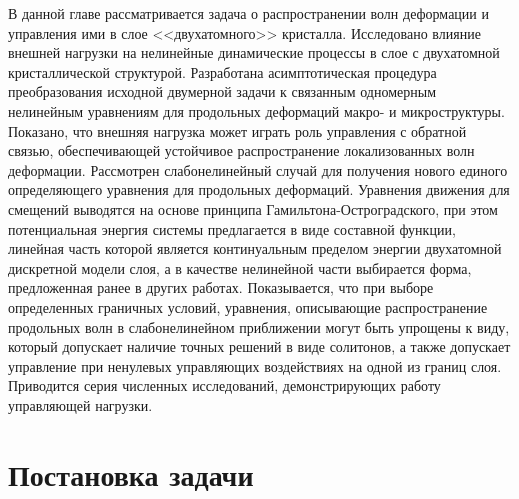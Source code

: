 В данной главе рассматривается задача о распространении волн деформации и управления ими в слое <<двухатомного>> кристалла. Исследовано влияние внешней нагрузки на нелинейные динамические процессы в слое с двухатомной кристаллической структурой. Разработана асимптотическая процедура преобразования исходной двумерной задачи к связанным одномерным нелинейным уравнениям для продольных деформаций макро- и микроструктуры. Показано, что внешняя нагрузка может играть роль управления с обратной связью, обеспечивающей устойчивое распространение локализованных волн деформации. Рассмотрен слабонелинейный случай для получения нового единого определяющего уравнения для продольных деформаций. Уравнения движения для смещений выводятся на основе принципа Гамильтона-Остроградского, при этом потенциальная энергия системы предлагается в виде составной функции, линейная часть которой является континуальным пределом энергии двухатомной дискретной модели слоя, а в качестве нелинейной части выбирается форма, предложенная ранее в других работах. Показывается, что при выборе определенных граничных условий, уравнения, описывающие распространение продольных волн в слабонелинейном приближении могут быть упрощены к виду, который допускает наличие точных решений в виде солитонов, а также допускает управление при ненулевых управляющих воздействиях на одной из границ слоя. Приводится серия численных исследований, демонстрирующих работу управляющей нагрузки.


\section{Постановка задачи}

